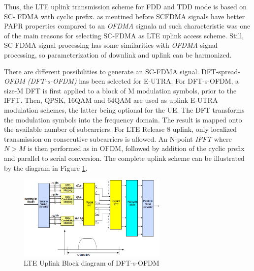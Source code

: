 Thus, the LTE uplink transmission scheme for FDD and TDD mode is based on SC-
FDMA with cyclic prefix. as mentined before  SCFDMA signals have better PAPR
properties compared to an \textit{OFDMA} signala nd such characteristic was one
of the main reasons for selecting SC-FDMA as LTE uplink access scheme. Still,
SC-FDMA signal processing has some similarities with \textit{OFDMA} signal
processing, so parameterization of downlink and uplink can be harmonized.

There are different possibilities to generate an SC-FDMA signal. DFT-spread-
\textit{OFDM} \textit{(DFT-s-OFDM)} has been selected for E-UTRA. For
DFT-s-OFDM, a size-M DFT is first applied to a block of M modulation symbols,
prior to the IFFT. Then, QPSK, 16QAM and 64QAM are used as uplink E-UTRA
modulation schemes, the latter being optional for the UE. The DFT transforms the
modulation symbols into the frequency domain. The result is mapped onto the
available number of subcarriers. For LTE Release 8 uplink, only localized
transmission on consecutive subcarriers is allowed. An N-point \textit{IFFT}
where $N>M$ is then performed as in OFDM, followed by addition of the cyclic
prefix and parallel to serial conversion. The complete uplink scheme can be
illustrated by the diagram in Figure \ref{fig:uplinkbd}.

\begin{figure}[htbp]
    \centering
    \includegraphics[width=0.65\textwidth]{./figures/uplink_scheme}
    \caption{ LTE Uplink Block diagram of DFT-s-OFDM
    \label{fig:uplinkbd}}
\end{figure}
